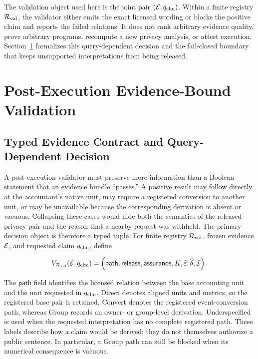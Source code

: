 The validation object used here is the joint pair
\((\mathcal{E},q_{\mathrm{clm}})\).  Within a finite registry
\(\mathcal{R}_{\mathrm{val}}\), the validator either emits the exact licensed wording or
blocks the positive claim and reports the failed relations.  It does not rank
arbitrary evidence quality, prove arbitrary programs, recompute a new privacy
analysis, or attest execution.  Section~\ref{sec:post-execution-validation}
formalizes this query-dependent decision and the fail-closed boundary that keeps
unsupported interpretations from being released.

\section{Post-Execution Evidence-Bound Validation}
\label{sec:post-execution-validation}
\subsection{Typed Evidence Contract and Query-Dependent Decision}
\label{subsec:query-dependent-claim-decision}

A post-execution validator must preserve more information than a Boolean statement
that an evidence bundle ``passes.''  A positive result may follow directly at the
accountant's native unit, may require a registered conversion to another unit, or
may be unavailable because the corresponding derivation is absent or vacuous.
Collapsing these cases would hide both the semantics of the released privacy pair
and the reason that a nearby request was withheld.  The primary decision object is
therefore a typed tuple.  For finite registry \(\mathcal{R}_{\mathrm{val}}\), frozen
evidence \(\mathcal{E}\), and requested claim \(q_{\mathrm{clm}}\), define

\begin{equation}
    V_{\mathcal{R}_{\mathrm{val}}}(\mathcal{E},q_{\mathrm{clm}})
    =
    \left(
        \mathsf{path},
        \mathsf{release},
        \mathsf{assurance},
        K,
        \widehat{\varepsilon},
        \widehat{\delta},
        \mathcal{I}
    \right).
    \label{eq:ch2-validator-decision}
\end{equation}

The \(\mathsf{path}\) field identifies the licensed relation between the base
accounting unit and the unit requested in \(q_{\mathrm{clm}}\).  \textsf{Direct}
denotes aligned units and metrics, so the registered base pair is retained.
\textsf{Convert} denotes the registered event-conversion path, whereas
\textsf{Group} records an owner- or group-level derivation.  \textsf{Underspecified}
is used when the requested interpretation has no complete registered path.  These
labels describe how a claim would be derived; they do not themselves authorize a
public sentence.  In particular, a \textsf{Group} path can still be blocked when
its numerical consequence is vacuous.

